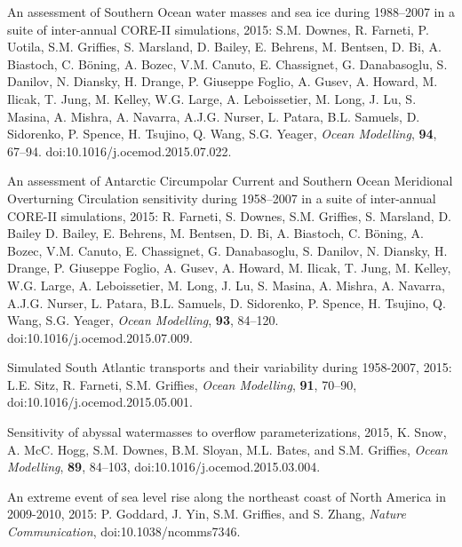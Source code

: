 \begin{etaremune}
\item An assessment of Southern Ocean water masses and sea ice during
  1988--2007 in a suite of inter-annual CORE-II simulations, 2015:
  S.M. Downes, R. Farneti, P. Uotila, S.M. Grif\/f\/ies,
  S. Marsland, D. Bailey, E. Behrens, M. Bentsen, D. Bi, A. Biastoch,
  C. B\"oning, A. Bozec, V.M. Canuto, E. Chassignet, G. Danabasoglu,
  S. Danilov, N. Diansky, H. Drange, P. Giuseppe Foglio, A. Gusev,
  A. Howard, M. Ilicak, T.  Jung, M. Kelley, W.G. Large,
  A. Leboissetier, M. Long, J. Lu, S. Masina, A. Mishra, A. Navarra,
  A.J.G. Nurser, L. Patara, B.L. Samuels, D. Sidorenko, P. Spence,
  H. Tsujino, Q. Wang, S.G. Yeager, {\it Ocean Modelling}, {\bf 94},
  67--94.  doi:10.1016/j.ocemod.2015.07.022.



\item An assessment of Antarctic Circumpolar Current and Southern
  Ocean Meridional Overturning Circulation sensitivity during
  1958--2007 in a suite of inter-annual CORE-II simulations, 2015:
  R. Farneti, S. Downes, S.M. Grif\/f\/ies, S. Marsland,
  D. Bailey D. Bailey, E. Behrens, M. Bentsen, D. Bi, A. Biastoch,
  C. B\"oning, A. Bozec, V.M. Canuto, E. Chassignet, G. Danabasoglu,
  S. Danilov, N. Diansky, H. Drange, P. Giuseppe Foglio, A. Gusev,
  A. Howard, M. Ilicak, T.  Jung, M. Kelley, W.G. Large,
  A. Leboissetier, M. Long, J. Lu, S. Masina, A. Mishra, A. Navarra,
  A.J.G. Nurser, L. Patara, B.L. Samuels, D. Sidorenko, P. Spence,
  H. Tsujino, Q. Wang, S.G. Yeager, {\it Ocean Modelling}, {\bf 93},
  84--120. doi:10.1016/j.ocemod.2015.07.009.

\item Simulated South Atlantic transports and their variability during 1958-2007, 2015: L.E.  Sitz, R. Farneti, S.M. Grif\/f\/ies,
{\it Ocean Modelling}, {\bf 91}, 70--90, doi:10.1016/j.ocemod.2015.05.001.

\item Sensitivity of abyssal watermasses to overflow parameterizations, 2015, K. Snow, A. McC. Hogg, S.M. Downes,  B.M. Sloyan, M.L. Bates, and S.M. Grif\/f\/ies, {\it Ocean Modelling}, {\bf 89}, 84--103, doi:10.1016/j.ocemod.2015.03.004.

\item An extreme event of sea level rise along the northeast coast of North America in 2009-2010, 2015: P.  Goddard, J. Yin, S.M. Grif\/f\/ies, and S. Zhang, {\it Nature Communication}, doi:10.1038/ncomms7346.


\end{etaremune}
